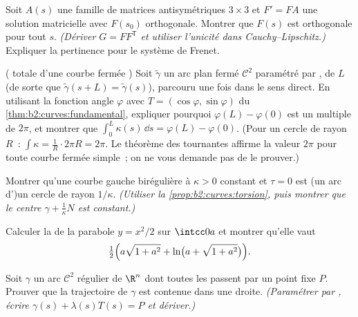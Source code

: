 \begin{exercise}[$\star\star\star$]\label{exo:b2:curves:7}
Soit $A(s)$ une famille  de matrices antisymétriques $3
\times 3$ et $F' = F A$ une solution matricielle avec $F(s_0)$
orthogonale. Montrer que $F(s)$ est orthogonale pour tout $s$.
\emph{(Dériver $G = F F^{\mathsf T}$ et utiliser l'unicité dans
Cauchy--Lipschitz.)} Expliquer la pertinence pour le système de
Frenet.
\end{exercise}

\begin{exercise}[$\star\star\star$]\label{exo:b2:curves:8}
( totale d'une courbe fermée ) Soit $\tilde\gamma$ un
arc plan fermé $\mathcal{C}^2$ paramétré par , de
 $L$
(de sorte que $\tilde\gamma(s + L) = \tilde\gamma(s)$), parcouru
une fois dans le sens direct. En utilisant la fonction angle
$\varphi$ avec $T =
(\cos\varphi, \sin\varphi)$ du
\cref{thm:b2:curves:fundamental}, expliquer pourquoi $\varphi(L) -
\varphi(0)$ est un multiple de $2\pi$, et montrer que
$\int_0^L \kappa(s)\,\dd s = \varphi(L) - \varphi(0)$. (Pour un
cercle de rayon $R$~: $\int \kappa = \frac1R \cdot 2\pi R = 2\pi$.
Le théorème des  tournantes affirme la valeur $2\pi$ pour
toute courbe fermée simple~; on ne vous demande pas de le prouver.)
\end{exercise}

\begin{exercise}[$\star\star\star$]\label{exo:b2:curves:9}
Montrer qu'une courbe gauche birégulière à $\kappa > 0$ constant et
$\tau = 0$ est (un arc d')un cercle de rayon $1/\kappa$.
\emph{(Utiliser la \cref{prop:b2:curves:torsion}, puis montrer que
le centre $\gamma + \frac1\kappa N$ est constant.)}
\end{exercise}

\begin{exercise}[$\star$]\label{exo:b2:curves:10}
Calculer la  de la parabole $y = x^2/2$ sur
$\intcc0a$ et montrer qu'elle vaut
\[
\tfrac12\Bigl(a\sqrt{1 + a^2} + \ln\bigl(a + \sqrt{1 +
a^2}\bigr)\Bigr).
\]
\end{exercise}

\begin{exercise}[$\star\star$]\label{exo:b2:curves:11}
Soit $\gamma$ un arc $\mathcal C^2$ régulier de $\R^n$ dont toutes
les  passent par un point fixe $P$. Prouver que
la trajectoire de $\gamma$ est contenue dans une droite.
\emph{(Paramétrer par , écrire $\gamma(s) +
\lambda(s)T(s) = P$ et dériver.)}
\end{exercise}

